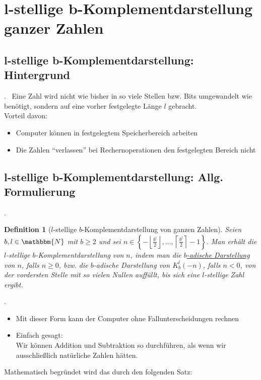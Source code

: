 \documentclass{beamer}
\newcommand{\N}{\mathbbm{N}} %
\newtheorem{defn}[satz]{Definition}
\newcommand{\subsecframe}{\begin{frame}{\insertsectionnumber.\insertsubsectionnumber \ \insertsubsection}}
\begin{document}
\section{l-stellige b-Komplementdarstellung ganzer Zahlen}

    \subsection{l-stellige b-Komplementdarstellung: Hintergrund}

        \subsecframe
            Eine Zahl wird nicht wie bisher in so viele Stellen bzw. Bits umgewandelt wie benötigt, sondern auf eine vorher festgelegte Länge $l$ gebracht. \\
            \vspace{\baselineskip}
            Vorteil davon:
            \begin{itemize}
                \item Computer können in festgelegtem Speicherbereich arbeiten
                \item Die Zahlen ``verlassen'' bei Rechernoperationen den festgelegten Bereich nicht
            \end{itemize}
        \end{frame}

    \subsection{l-stellige b-Komplementdarstellung: Allg. Formulierung}

        \subsecframe
            \begin{defn}[$l$-stellige $b$-Komplementdarstellung von ganzen Zahlen]
                Seien $b,l \in \N$ mit $b \geq 2$ und sei $n \in \left\{- \left\lfloor \displaystyle\frac{b^l}{2} \right\rfloor, \dots, \left\lceil \displaystyle\frac{b^l}{2} \right\rceil -1 \right\} .$
                Man erhält die $l$-stellige $b$-Komplementdarstellung von $n$, indem man die \hyperref[satz:b-adische_Darstellung]{$b$-adische Darstellung} von $n$, falls $n \geq 0$,
                bzw. die $b$-adische Darstellung von $K_b^l(-n)$, falls $n < 0$, von der vordersten Stelle mit so vielen Nullen auffüllt, bis sich eine $l$-stellige Zahl ergibt.
            \end{defn}
        \end{frame}

        \subsecframe
            \begin{itemize}
                \item Mit dieser Form kann der Computer ohne Fallunterscheidungen rechnen
                \item Einfach gesagt: \\
                    Wir können Addition und Subtraktion so durchführen, als wenn wir ausschließlich natürliche Zahlen hätten.
            \end{itemize}
            Mathematisch begründet wird das durch den folgenden Satz:
        \end{frame}
\end{document}
